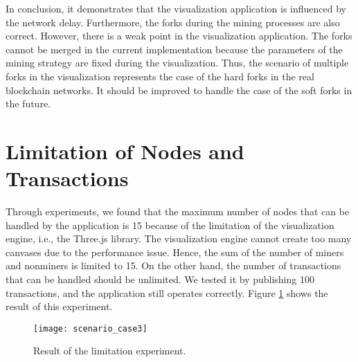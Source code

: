 In conclusion, it demonstrates that the visualization application is influenced by the network delay. Furthermore, the forks during the mining processes are also correct. However, there is a weak point in the visualization application. The forks cannot be merged in the current implementation because the parameters of the mining strategy are fixed during the visualization. Thus, the scenario of multiple forks in the visualization represents the case of the hard forks in the real blockchain networks. It should be improved to handle the case of the soft forks in the future.

\section{Limitation of Nodes and Transactions}

Through experiments, we found that the maximum number of nodes that can be handled by the application is 15 because of the limitation of the visualization engine, i.e., the Three.js library. The visualization engine cannot create too many canvases due to the performance issue. Hence, the sum of the number of miners and nonminers is limited to 15. On the other hand, the number of transactions that can be handled should be unlimited. We tested it by publishing 100 transactions, and the application still operates correctly. Figure \ref{fig:result of the limitation experiment} shows the result of this experiment.

\begin{figure}[htb]
    \centering
    \texttt{[image: scenario\_case3]}
    \caption{Result of the limitation experiment.}
    \label{fig:result of the limitation experiment}
\end{figure}


